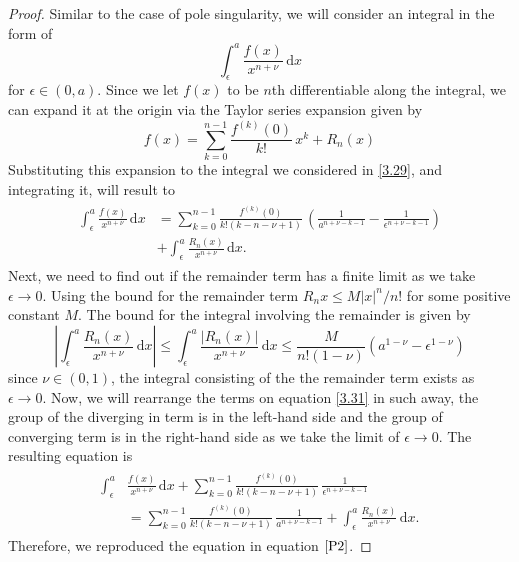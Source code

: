 \begin{proof}
Similar to the case of pole singularity, we will consider an integral in the form of 
\begin{equation}
    \int_\epsilon^a \frac{f(x)}{x^{n+ \nu}} \, \mathrm{d}x
    \label{3.29}
\end{equation}
for $\epsilon \in (0,a)$. Since we let $f(x)$ to be $n$th differentiable along the integral, we can expand it at the origin via the Taylor series expansion given by
\begin{equation}
    f(x) = \sum_{k=0}^{n-1} \frac{f^{(k)}(0)}{k!} \, x^{k} + R_{n}(x)
\end{equation}
Substituting this expansion to the integral we considered in \eqref{3.29}, and integrating it, will result to
\begin{align}
\begin{split}
    \int_\epsilon^a \frac{f(x)}{x^{n+ \nu}} \, \mathrm{d}x & = \sum_{k=0}^{n-1} \frac{f^{(k)}(0)}{k!(k-n-\nu+1)} \, \left( \frac{1}{a^{n+\nu-k-1}} - \frac{1}{\epsilon^{n+\nu-k-1}} \right) \\& + \int_\epsilon^a \frac{R_{n}(x)}{x^{n+\nu}} \, \mathrm{d}x. 
    \label{3.31}
\end{split}
\end{align}
Next, we need to find out if the remainder term has a finite limit as we take $\epsilon \to 0$. Using the bound for the remainder term $R_n{x} \leq M |x|^{n}/n!$ for some positive constant $M$.  The bound for the integral involving the remainder is given by
\begin{equation}
    \left| \int_\epsilon^a \frac{R_{n}(x)}{x^{n+\nu}} \, \mathrm{d}x \right| \leq \int_\epsilon^a \frac{|R_{n}(x)|}{x^{n+\nu}} \, \mathrm{d}x \leq \frac{M}{n!(1-\nu)} (a^{1-\nu} - \epsilon^{1-\nu})
\end{equation}
since $\nu \in (0,1)$, the integral consisting of the the remainder term exists as $\epsilon \to 0$. Now, we will rearrange the terms on equation \eqref{3.31} in such away, the group of the diverging in term is in the left-hand side and the group of converging term is in the right-hand side as we take the limit of $\epsilon \to 0$. The resulting equation is 
\begin{align}
\begin{split}
    \int_\epsilon^a & \frac{f(x)}{x^{n+ \nu}} \, \mathrm{d}x + \sum_{k=0}^{n-1} \frac{f^{(k)}(0)}{k!(k-n-\nu+1)} \, \frac{1}{\epsilon^{n+\nu-k-1}} \\&  = \sum_{k=0}^{n-1} \frac{f^{(k)}(0)}{k!(k-n-\nu+1)} \, \frac{1}{a^{n+\nu-k-1}} + \int_\epsilon^a \frac{R_{n}(x)}{x^{n+\nu}} \, \mathrm{d}x. 
\end{split}
\end{align}
 Therefore, we reproduced the equation in equation $\eqref{P2}$.
\end{proof}

